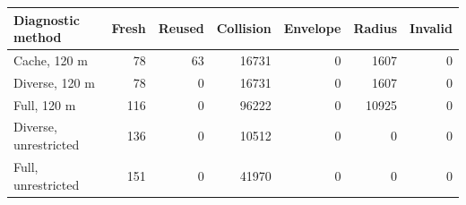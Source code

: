 \begin{tabular}{lrrrrrr}
\toprule
Diagnostic method & Fresh & Reused & Collision & Envelope & Radius & Invalid \\
\midrule
Cache, 120 m & 78 & 63 & 16731 & 0 & 1607 & 0 \\
Diverse, 120 m & 78 & 0 & 16731 & 0 & 1607 & 0 \\
Full, 120 m & 116 & 0 & 96222 & 0 & 10925 & 0 \\
Diverse, unrestricted & 136 & 0 & 10512 & 0 & 0 & 0 \\
Full, unrestricted & 151 & 0 & 41970 & 0 & 0 & 0 \\
\bottomrule
\end{tabular}
